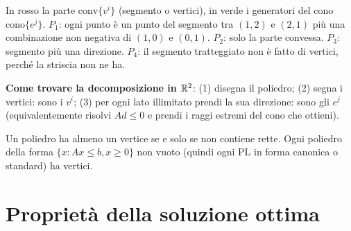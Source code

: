 In rosso la parte $\mathrm{conv}\{v^i\}$ (segmento o vertici), in verde i generatori del cono $\mathrm{cono}\{e^j\}$. $P_1$: ogni punto è un punto del segmento tra $(1,2)$ e $(2,1)$ più una combinazione non negativa di $(1,0)$ e $(0,1)$. $P_2$: solo la parte convessa. $P_3$: segmento più una direzione. $P_4$: il segmento tratteggiato non è fatto di vertici, perché la striscia non ne ha.

\textbf{Come trovare la decomposizione in $\mathbb{R}^2$}: (1) disegna il poliedro; (2) segna i vertici: sono i $v^i$; (3) per ogni lato illimitato prendi la sua direzione: sono gli $e^j$ (equivalentemente risolvi $Ad\le0$ e prendi i raggi estremi del cono che ottieni).

Un poliedro ha almeno un vertice se e solo se non contiene rette. Ogni poliedro della forma $\{x: Ax\le b, x\ge0\}$ non vuoto (quindi ogni PL in forma canonica o standard) ha vertici.

\section{Proprietà della soluzione ottima}

